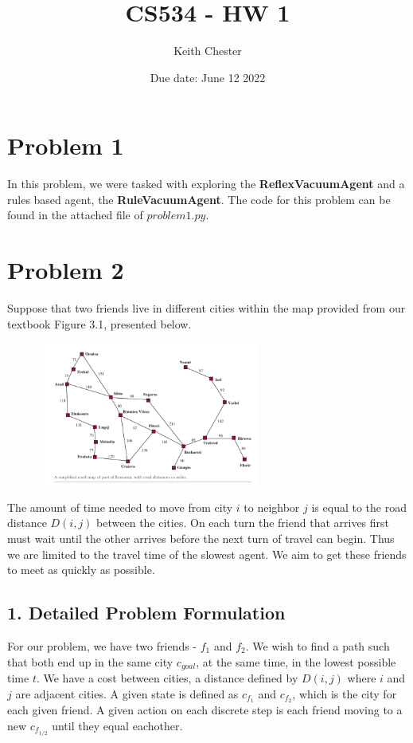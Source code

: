 \documentclass{article}
\title{CS534 - HW 1}
\author{Keith Chester}
\date{Due date: June 12 2022}
\begin{document}
\maketitle

\section*{Problem 1}

In this problem, we were tasked with exploring the \textbf{ReflexVacuumAgent} and a rules based agent, the \textbf{RuleVacuumAgent}. The code for this problem can be found in the attached file of $problem1.py$.

\section*{Problem 2}
Suppose that two friends live in different cities within the map provided from our textbook Figure 3.1, presented below.

\begin{figure}[H]
    \centering
    \includegraphics[width = 0.65\textwidth]{imgs/figure31.png}
    \label{fig:fig31}
\end{figure}

The amount of time needed to move from city $i$ to neighbor $j$ is equal to the road distance $D(i,j)$ between the cities. On each turn the friend that arrives first must wait until the other arrives before the next turn of travel can begin. Thus we are limited to the travel time of the slowest agent. We aim to get these friends to meet as quickly as possible.

\subsection*{1. Detailed Problem Formulation}
For our problem, we have two friends - $f_1$ and $f_2$. We wish to find a path such that both end up in the same city $c_{goal}$, at the same time, in the lowest possible time $t$. We have a cost between cities, a distance defined by $D(i,j)$ where $i$ and $j$ are adjacent cities. A given state is defined as $c_{f_1}$ and $c_{f_2}$, which is the city for each given friend. A given action on each discrete step is each friend moving to a new $c_{f_{1/2}}$ until they equal eachother.
\end{document}
